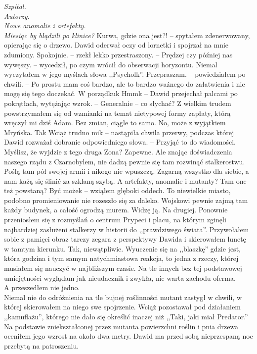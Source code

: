 \documentclass[../MAIN.tex]{subfiles}
\begin{document}
{\noindent\em Szpital.
\\
Autorzy.
\\
Nowe anomalie i artefakty.
\\
Miesiąc by błądzili po klinice?}
\sx Kurwa, gdzie ona jest?! -- spytałem zdenerwowany, opierając się o drzewo.
Dawid oderwał oczy od lornetki i spojrzał na mnie zdumiony.
\xx Spokojnie. -- rzekł lekko przestraszony. -- Prędzej czy później nas wywęszy. -- wycedził, po czym wrócił do obserwacji horyzontu. Niemal wyczytałem w jego myślach słowa ,,Psychol\3k''.
\xx Przepraszam. -- powiedziałem po chwili. -- Po prostu mam coś bardzo, ale to bardzo ważnego do załatwienia i nie mogę się tego doczekać.
\xx W porządku\3k Hmm\3k -- Dawid przejechał palcami po pokrętłach, wytężając wzrok. -- Generalnie -- co słychać?
\qd
Z wielkim trudem powstrzymałem się od wzmianki na temat nietypowej formy zapłaty, którą wręczył mi dziś Adam.
\sx Bez zmian, ciągle to samo. No, może z wyjątkiem Mryńska.
\xx Ta\3k Wciąż trudno mi\3k -- nastąpiła chwila przerwy, podczas której Dawid rozważał dobranie odpowiedniego słowa. -- Przyjąć to do wiadomości. Myślisz, że wyjdzie z tego druga Zona?
\xx Zapewne. Ale znając doświadczenia naszego rządu z Czarnobylem, nie dadzą pewnie się tam rozwinąć stalkerostwu. Poślą tam pół swojej armii i nikogo nie wpuszczą. Zagarną wszystko dla siebie, a nam każą się ślinić za szklaną szybą.
\xx A artefakty, anomalie i mutanty? Tam one też powstaną?
\xx Być może\3k -- wziąłem głęboki oddech.
\xx To niewielkie miasto, podobno promieniowanie nie rozeszło się za daleko.
\xx Wojskowi pewnie zajmą tam każdy budynek, a całość ogrodzą murem.
\xx Widzę ją. Na drugiej.
\qd
Ponownie przeniosłem się z rozmyślań o centrum Prypeci i placu, na którym zginęli najbardziej zasłużeni stalkerzy w historii do ,,prawdziwego świata''. Przywołałem sobie z pamięci obraz tarczy zegara z perspektywy Dawida i skierowałem lunetę w tamtym kierunku. Tak, niewątpliwie. Wyuczenie się na ,,blaszkę'' gdzie jest, która godzina i tym samym natychmiastowa reakcja, to jedna z rzeczy, której musiałem się nauczyć w najbliższym czasie. Na tle innych bez tej podstawowej umiejętności wyglądam jak nieudacznik i zwykła, nie warta zachodu oferma.\\
A przeszedłem nie jedno.\\
Niemal nie do odróżnienia na tle bujnej roślinności mutant zastygł w chwili, w której skierowałem na niego swe spojrzenie. Wciąż pozostawał pod działaniem ,,kamuflażu'', którego nie dało się określić inaczej niż ,,Taki, jaki miał Predator.'' Na podstawie zniekształconej przez mutanta powierzchni roślin i pnia drzewa oceniłem jego wzrost na około dwa metry. Dawid ma przed sobą nieprzespaną noc przebytą na patroszeniu.\\
\end{document}

